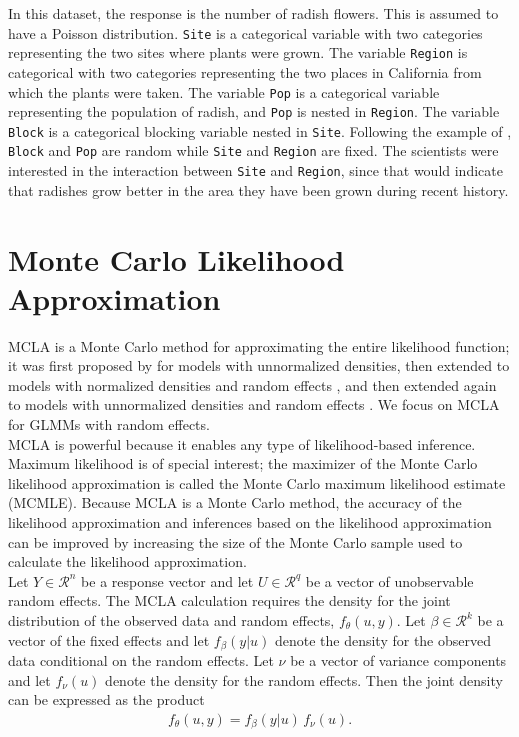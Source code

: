 \documentclass[article]{jss}
\begin{document}
In this dataset, the response is the number of radish flowers. This is assumed to have a Poisson distribution.  \texttt{Site} is a categorical variable with two categories representing the two sites where plants were grown. The variable \texttt{Region} is categorical with two categories representing the two places in California from which the plants were taken. The variable \texttt{Pop} is a categorical variable representing the population of radish, and \texttt{Pop} is nested in \texttt{Region}. The variable \texttt{Block} is a categorical blocking variable nested in \texttt{Site}.  Following the example of \citet{ridley:ellstrand:2010}, \texttt{Block} and \texttt{Pop} are random while \texttt{Site} and \texttt{Region} are fixed. The scientists were interested in  the interaction between \texttt{Site} and \texttt{Region}, since that would indicate that radishes grow better in the area they have been grown during recent history.




\section{Monte Carlo Likelihood Approximation}

MCLA is a  Monte Carlo method for approximating the entire likelihood function; it was first proposed by \citet{geyer:1990} for models with unnormalized densities, then extended to models with normalized densities and random effects \citep{thom:guo:1991}, and then extended again to models with unnormalized densities and random effects \citep{gelf:carl:1993}.
 We focus on  MCLA  for GLMMs with random effects.  \\

MCLA is powerful  because it enables any type of likelihood-based inference.  Maximum likelihood is of special interest; the maximizer of the Monte Carlo likelihood approximation is called the Monte Carlo maximum likelihood estimate (MCMLE). Because MCLA is a Monte Carlo method, the accuracy of the likelihood approximation and inferences based on the likelihood approximation  can be improved by increasing the size of the Monte Carlo sample used to calculate the likelihood approximation. \\

Let $Y \in \mathcal{R}^n$ be a response vector and let $U \in \mathcal{R}^q$ be a vector of unobservable random effects. The MCLA calculation requires the density for the joint distribution of the observed data  and random effects, $f_\theta(u,y)$. Let  $\beta \in \mathcal{R}^k$ be a vector of the fixed effects and let $f_\beta(y|u)$ denote the density for the observed data conditional on the random effects. Let $\nu$ be a vector of variance components and let $f_\nu (u)$ denote the density for the random effects. Then the joint density can be expressed as the product 
\begin{align}
f_\theta (u,y) = f_\beta(y|u) \, f_\nu (u).
\end{align}
\end{document}
